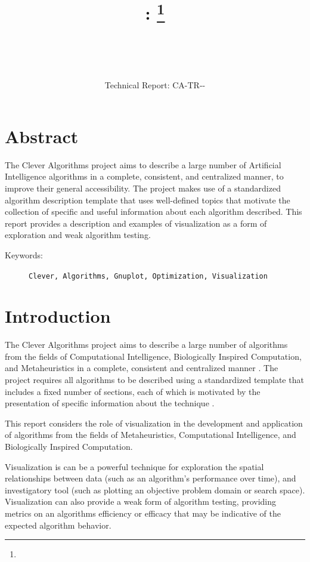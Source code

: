 \documentclass[a4paper, 11pt]{article}
\title{{\myreporttitle}: {\myreportsubtitle}\footnote{\myreportlicense}}
\author{\myreportauthor\\{\myreportemail}\\\small\myreportproject}
\date{\myreportfulldate\\{\small{Technical Report: CA-TR-{\myreportdate}-\myreportversion}}}
\begin{document}
\maketitle

\section*{Abstract} 
The Clever Algorithms project aims to describe a large number of Artificial Intelligence algorithms in a complete, consistent, and centralized manner, to improve their general accessibility. 
The project makes use of a standardized algorithm description template that uses well-defined topics that motivate the collection of specific and useful information about each algorithm described.
This report provides a description and examples of visualization as a form of exploration and weak algorithm testing. 

\begin{description}
	\item[Keywords:] {\small\texttt{Clever, Algorithms, Gnuplot, Optimization, Visualization}}
\end{description} 

\section{Introduction}
\label{sec:introduction}
The Clever Algorithms project aims to describe a large number of algorithms from the fields of Computational Intelligence, Biologically Inspired Computation, and Metaheuristics in a complete, consistent and centralized manner \cite{Brownlee2010}.
The project requires all algorithms to be described using a standardized template that includes a fixed number of sections, each of which is motivated by the presentation of specific information about the technique \cite{Brownlee2010a}.

This report considers the role of visualization in the development and application of algorithms from the fields of Metaheuristics, Computational Intelligence, and Biologically Inspired Computation.

Visualization is can be a powerful technique for exploration the spatial relationships between data (such as an algorithm's performance over time), and investigatory tool (such as plotting an objective problem domain or search space). Visualization can also provide a weak form of algorithm testing, providing metrics on an algorithms efficiency or efficacy that may be indicative of the expected algorithm behavior.
\end{document}
